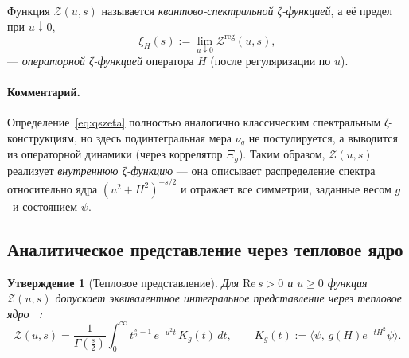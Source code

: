 \documentclass{article}
\numberwithin{equation}{section}
\theoremstyle{plain}
\newtheorem{proposition}{Утверждение}
\theoremstyle{definition}
\theoremstyle{remark}
\def\infty{∞}\def\partial{∂}\def\sum{Σ}\def\int{∫}%
\begin{document}
\noindent
Функция $\mathcal Z(u,s)$ называется \emph{квантово-спектральной ζ-функцией}, а её предел при $u\downarrow0$,
\begin{equation}
\xi_H(s)
:=\lim_{u\downarrow0}\mathcal Z^{\mathrm{reg}}(u,s),
\end{equation}
— \emph{операторной ζ-функцией} оператора $H$ (после регуляризации по $u$).

\paragraph{Комментарий.}  
Определение~\eqref{eq:qszeta} полностью аналогично классическим спектральным ζ-конструкциям, но здесь подинтегральная мера $\nu_g$ не постулируется, а выводится из операторной динамики (через коррелятор $\Xi_g$).  
Таким образом, $\mathcal Z(u,s)$ реализует \emph{внутреннюю ζ-функцию} — она описывает распределение спектра относительно ядра $(u^2+H^2)^{-s/2}$ и отражает все симметрии, заданные весом $g$ ~\cite{Voros1987}и состоянием $\psi$.

\subsection{Аналитическое представление через тепловое ядро}
\label{subsec:heat}

\begin{proposition}[Тепловое представление]
\label{prop:heat_rep}
Для $\mathrm{Re}\,s>0$ и $u\ge0$ функция $\mathcal Z(u,s)$ допускает эквивалентное интегральное представление через тепловое ядро ~\cite{BerlineGetzlerVergne1992}:
\begin{equation}
\label{eq:heat_rep}
\mathcal Z(u,s)
=\frac{1}{\Gamma(\frac s2)}
\int_0^\infty 
t^{\frac s2 -1}\,e^{-u^2t}\,
K_g(t)\,dt,
\qquad
K_g(t):=\langle \psi,\,g(H)e^{-tH^2}\psi\rangle.
\end{equation}
\end{proposition}
\end{document}

